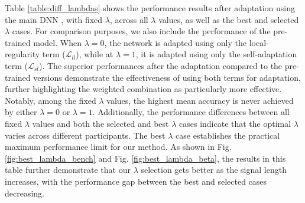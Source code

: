 \documentclass[12pt]{iopart}
\begin{document}
Table \ref{table:diff_lambdas} shows the performance results after adaptation using the main DNN \cite{ournetwork}, with fixed $\lambda$, across all $\lambda$ values, as well as the best and selected $\lambda$ cases. For comparison purposes, we also include the performance of the pre-trained model. When $\lambda=0$, the network is adapted using only the local-regularity term ($\mathcal{L}_{ll}$), while at $\lambda=1$, it is adapted using only the self-adaptation term ($\mathcal{L}_{sl}$). The superior performances after the adaptation compared to the pre-trained versions demonstrate the effectiveness of using both terms for adaptation, further highlighting the weighted combination as particularly more effective. Notably, among the fixed $\lambda$ values, the highest mean accuracy is never achieved by either $\lambda=0$ or $\lambda=1$. Additionally, the performance differences between all fixed $\lambda$ values and both the selected and best $\lambda$ cases indicate that the optimal $\lambda$ varies across different participants. The best $\lambda$ case establishes the practical maximum performance limit for our method. As shown in Fig. \ref{fig:best_lambda_bench} and Fig. \ref{fig:best_lambda_beta}, the results in this table further demonstrate that our $\lambda$ selection gets better as the signal length increases, with the performance gap between the best and selected cases decreasing.
\end{document}
